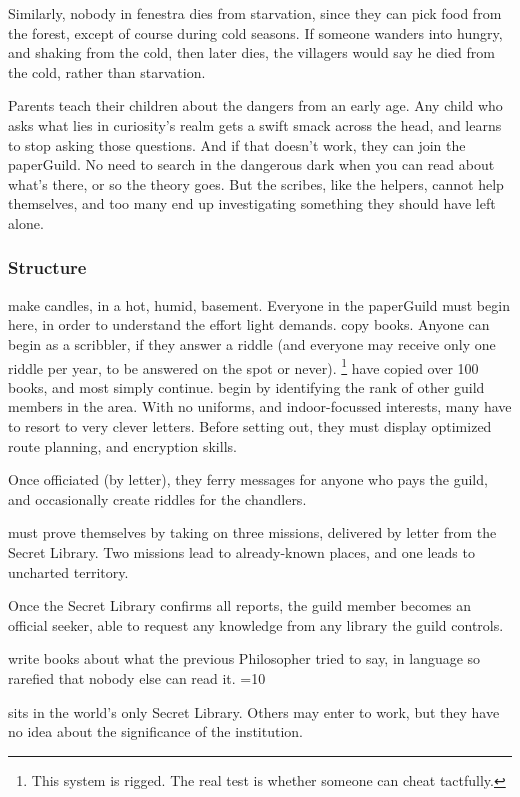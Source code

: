 \begin{multicols}{2}
{Similarly, nobody in \gls{fenestra} dies from starvation, since they can pick food from the forest, except of course during cold seasons.
If someone wanders into  hungry, and shaking from the cold, then later dies, the villagers would say he died from the cold, rather than starvation.}

Parents teach their children about the dangers from an early age.
Any child who asks what lies in curiosity's realm gets a swift smack across the head, and learns to stop asking those questions.
And if that doesn't work, they can join the \gls{paperGuild}.
No need to search in the dangerous dark when you can read about what's there, or so the theory goes.
But the scribes, like the helpers, cannot help themselves, and too many end up investigating something they should have left alone.

\subsubsection{Structure}

\begin{description}
  make candles, in a hot, humid, basement.
  Everyone in the \gls{paperGuild} must begin here, in order to understand the effort light demands.
  copy books.
  Anyone can begin as a scribbler, if they answer a riddle (and everyone may receive only one riddle per year, to be answered on the spot or never).%
  \footnote{This system is rigged. The real test is whether someone can cheat tactfully.}
  have copied over 100 books, and most simply continue.
  \label{knowledgeWanderer}%
  begin by identifying the rank of other guild members in the area.
  With no uniforms, and indoor-focussed interests, many have to resort to very clever letters.
  Before setting out, they must display optimized route planning, and encryption skills.

  Once officiated (by letter), they ferry messages for anyone who pays the guild, and occasionally create riddles for the chandlers.
  \item[\Glspl{seeker}]
  must prove themselves by taking on three missions, delivered by letter from the Secret Library.
  Two missions lead to already-known places, and one leads to uncharted territory.

  Once the Secret Library confirms all reports, the guild member becomes an official \gls{seeker}, able to request any knowledge from any library the guild controls.
  \item[Philosophers]
  write books about what the previous Philosopher tried to say, in language so rarefied that nobody else can read it.
  \ifnum\value{season}=10
  \item[The Last Librarian]
  sits in the world's only Secret Library.
  Others may enter to work, but they have no idea about the significance of the institution.


\end{description}
\end{multicols}
